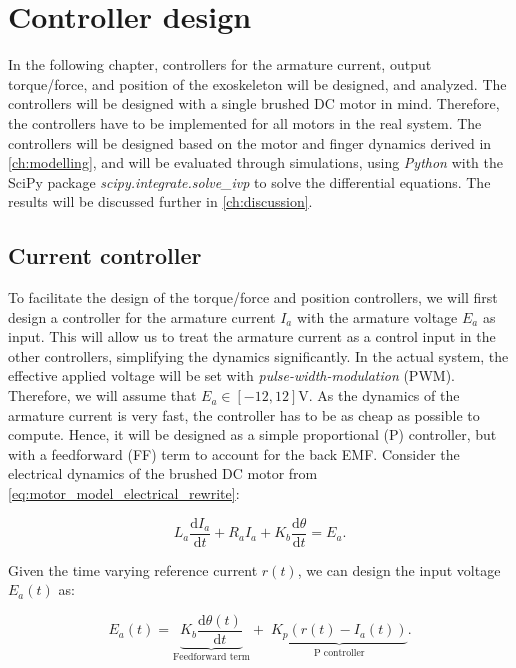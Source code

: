 \chapter{Controller design}%
\label{ch:controller_design}

In the following chapter, controllers for the armature current, output torque/force, and position of the exoskeleton will be designed, and analyzed. The controllers will be designed with a single brushed DC motor in mind. Therefore, the controllers have to be implemented for all motors in the real system. The controllers will be designed based on the motor and finger dynamics derived in \cref{ch:modelling}, and will be evaluated through simulations, using \textit{Python} with the SciPy package \textit{scipy.integrate.solve\_ivp} \parencite{Solve_ivpSciPyV1170} to solve the differential equations. The results will be discussed further in \cref{ch:discussion}.

\section{Current controller}
\label{sec:controller_design_current_controller}

To facilitate the design of the torque/force and position controllers, we will first design a controller for the armature current $I_a$ with the armature voltage $E_a$ as input. This will allow us to treat the armature current as a control input in the other controllers, simplifying the dynamics significantly. In the actual system, the effective applied voltage will be set with \textit{pulse-width-modulation} (PWM). Therefore, we will assume that $E_a \in [-12, 12]\si{\volt}$. As the dynamics of the armature current is very fast, the controller has to be as cheap as possible to compute. Hence, it will be designed as a simple proportional (P) controller, but with a feedforward (FF) term to account for the back EMF. Consider the electrical dynamics of the brushed DC motor from \cref{eq:motor_model_electrical_rewrite}:

\begin{equation}
    \label{eq:controller_design_electrical_dynamics}
    L_a \frac{\mathrm{d}I_a}{\mathrm{d}t} + R_a I_a + K_b \frac{\mathrm{d}\theta}{\mathrm{d}t}= E_a.
\end{equation}

Given the time varying reference current $r(t)$, we can design the input voltage $E_a(t)$ as:

\begin{equation}
    \label{eq:controller_design_voltage_input}
    E_a(t) = \underbrace{K_b \frac{\mathrm{d}\theta(t)}{\mathrm{d}t}}_{\text{Feedforward term}} + \;\underbrace{K_p \left(r(t) - I_a(t)\right)}_{\text{P controller}}.
\end{equation}


